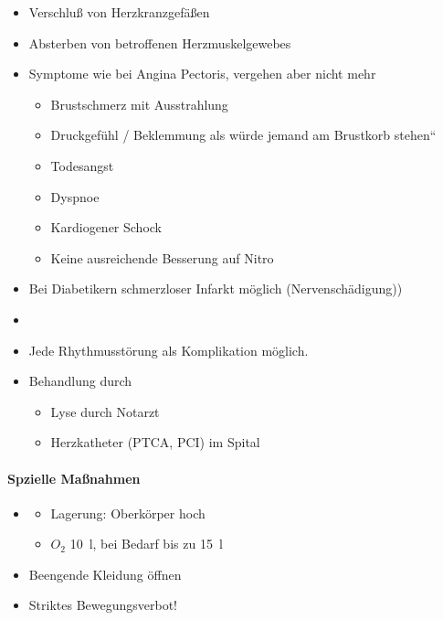 {\begin{itemize}
\item Verschluß von Herzkranzgefäßen
\item Absterben von betroffenen Herzmuskelgewebes
\item Symptome wie bei Angina Pectoris, vergehen aber nicht
mehr
\begin{itemize}
	\item Brustschmerz mit Ausstrahlung 
	\item Druckgef\"uhl / Beklemmung {\quotedblbase}als w\"urde jemand am
	Brustkorb stehen{\textquotedblleft}
	\item Todesangst
	\item Dyspnoe
	\item Kardiogener Schock
	\item Keine ausreichende Besserung auf Nitro
\end{itemize}
\item Bei Diabetikern schmerzloser Infarkt möglich
(Nervenschädigung))
\item {}
\item Jede Rhythmusstörung als Komplikation möglich.
\item Behandlung durch
\begin{itemize}
    \item Lyse durch Notarzt
    \item Herzkatheter (PTCA, PCI) im Spital
\end{itemize}
\end{itemize}}

\begin{center}
 

\end{center}
\begin{gMassnahmenEnv}
    \paragraph{Spzielle Ma{\ss}nahmen}
    
    \begin{itemize}
        \item \gTxMassVitBes 
        \begin{itemize}
            \item Lagerung: Oberk\"orper hoch
            \item $O_2$ 10~l, bei Bedarf bis zu 15~l
        \end{itemize}
        \item Beengende Kleidung \"offnen
        \item Striktes Bewegungsverbot!
    \end{itemize}
\end{gMassnahmenEnv}

